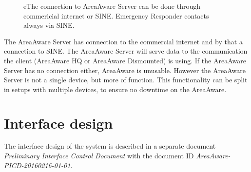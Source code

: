     \begin{figure}[ht]
        \centering
        \quad\quad
        \quad\quad
        \caption{eThe connection to AreaAware Server can be done through commericial internet or SINE. Emergency Responder contacts always via SINE.}
        \label{fig:ce}
    \end{figure}



The AreaAware Server has connection to the commercial internet and by that a connection to SINE.
The AreaAware Server will serve data to the communication the client (AreaAware HQ or AreaAware Dismounted) is using.
If the AreaAware Server has no connection either, AreaAware is unusable.
However the AreaAware Server is not a single device, but more of function.
This functionality can be split in setups with multiple devices, to ensure no downtime on the AreaAware.


\section{Interface design}
\label{sec:arch_interface}
The interface design of the system is described in a separate document \emph{Preliminary Interface Control Document} with the document ID \emph{AreaAware-PICD-20160216-01-01}.
